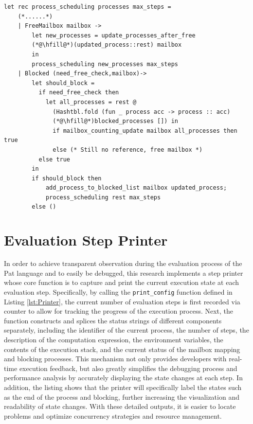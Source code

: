 \documentclass{l4proj}
\begin{document}
\noindent\begin{minipage}{\linewidth}
\lstset{style=Ocamlstyle,}
\begin{lstlisting}[caption={Mailbox free and process blocking}, label={lst:blockfree}]
let rec process_scheduling processes max_steps =
    (*......*)
    | FreeMailbox mailbox -> 
        let new_processes = update_processes_after_free 
        (*@\hfill@*)(updated_process::rest) mailbox 
        in
        process_scheduling new_processes max_steps
    | Blocked (need_free_check,mailbox)->
        let should_block = 
          if need_free_check then
            let all_processes = rest @
              (Hashtbl.fold (fun _ process acc -> process :: acc) 
              (*@\hfill@*)blocked_processes []) in
              if mailbox_counting_update mailbox all_processes then true
              else (* Still no reference, free mailbox *)
          else true
        in
        if should_block then
            add_process_to_blocked_list mailbox updated_process;
            process_scheduling rest max_steps
        else ()
\end{lstlisting}
\end{minipage}

\section{Evaluation Step Printer}

In order to achieve transparent observation during the evaluation process of the Pat language and to easily be debugged, this research implements a step printer whose core function is to capture and print the current execution state at each evaluation step. Specifically, by calling the \texttt{print\_config} function defined in Listing \ref{lst:Printer}, the current number of evaluation steps is first recorded via counter to allow for tracking the progress of the execution process. Next, the function constructs and splices the status strings of different components separately, including the identifier of the current process, the number of steps, the description of the computation expression, the environment variables, the contents of the execution stack, and the current status of the mailbox mapping and blocking processes. This mechanism not only provides developers with real-time execution feedback, but also greatly simplifies the debugging process and performance analysis by accurately displaying the state changes at each step. In addition, the listing shows that the printer will specifically label the states such as the end of the process and blocking, further increasing the visualization and readability of state changes. With these detailed outputs, it is easier to locate problems and optimize concurrency strategies and resource management.
\end{document}
